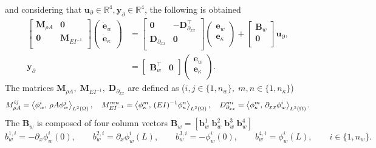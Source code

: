  and considering that $\bm{u}_\partial \in \mathbb{R}^4, \bm{y}_\partial \in \mathbb{R}^4$, the following is obtained
\begin{equation}
\begin{aligned}
\begin{bmatrix}
\mathbf{M}_{\rho A} & \mathbf{0} \\
\mathbf{0} & \mathbf{M}_{EI^{-1}} \\
\end{bmatrix}
\begin{pmatrix}
\dot{\mathbf{e}}_{w} \\
\dot{\mathbf{e}}_{\kappa} \\
\end{pmatrix}
&= \begin{bmatrix}
\mathbf{0} & - \mathbf{D}_{\partial_{xx}}^\top \\
\mathbf{D}_{\partial_{xx}} & \mathbf{0} \\
\end{bmatrix} 
\begin{pmatrix}
\mathbf{e}_{w} \\
\mathbf{e}_{\kappa} \\
\end{pmatrix} + 
\begin{bmatrix}
\mathbf{B}_w\\
\mathbf{0}\\
\end{bmatrix}
\mathbf{u}_\partial, \\
{\mathbf{y}_\partial} &= \begin{bmatrix}
\mathbf{B}_w^\top & \mathbf{0}
\end{bmatrix}\begin{pmatrix}
\mathbf{e}_{w} \\
\mathbf{e}_{\kappa} \\
\end{pmatrix}.
\end{aligned}
\end{equation}
The matrices $\mathbf{M}_{\rho A}, \; \mathbf{M}_{EI^{-1}}, \; 
\mathbf{D}_{\partial_{xx}}$ are defined as ($i, j \in \{1, n_w\}, \; m, n \in \{1, n_\kappa\}$)
\begin{equation}
M_{\rho A}^{ij} = \inner[L^2(\Omega)]{\phi_w^i}{\rho A \phi_w^j}, \quad
M_{{EI}^{-1}}^{mn} = \inner[L^2(\Omega)]{\phi_\kappa^m}{(EI)^{-1}\phi_\kappa^n}, \quad D_{\partial_{xx}}^{mi} = \inner[L^2(\Omega)]{\phi_\kappa^m}{\partial_{xx} \phi_w^i}.
\end{equation}
The $\mathbf{B}_w$ is composed of four column vectors $\mathbf{B}_w = [\mathbf{b}_w^1 \; \mathbf{b}_w^2 \; \mathbf{b}_w^3 \; \mathbf{b}_w^4]$
\begin{equation}
{b}_w^{1,i} = -\partial_x \phi_w^i(0), \qquad {b}_w^{2,i} = \partial_x \phi_w^i(L), \qquad {b}_w^{3,i} = -\phi_w^i(0), \qquad {b}_w^{4,i} = \phi_w^i(L), \qquad i \in \{1, n_w\}.
\end{equation}

